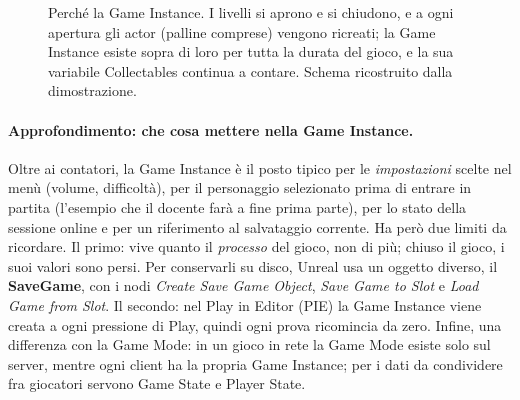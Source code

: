 \begin{figure}[htbp]
\centering
{}
\caption{Perché la Game Instance. I livelli si aprono e si chiudono, e a ogni apertura
gli actor (palline comprese) vengono ricreati; la Game Instance esiste sopra di loro per
tutta la durata del gioco, e la sua variabile Collectables continua a contare. Schema
ricostruito dalla dimostrazione.}
\label{ue8:fig:persistenza}
\end{figure}

\paragraph{Approfondimento: che cosa mettere nella Game Instance.} Oltre ai contatori, la
Game Instance è il posto tipico per le \emph{impostazioni} scelte nel menù (volume,
difficoltà), per il personaggio selezionato prima di entrare in partita (l'esempio che il
docente farà a fine prima parte), per lo stato della sessione online e per un
riferimento al salvataggio corrente. Ha però due limiti da ricordare. Il primo: vive
quanto il \emph{processo} del gioco, non di più; chiuso il gioco, i suoi valori sono
persi. Per conservarli su disco, Unreal usa un oggetto diverso, il \textbf{SaveGame},
con i nodi \emph{Create Save Game Object}, \emph{Save Game to Slot} e \emph{Load Game
from Slot}. Il secondo: nel Play in Editor (PIE) la Game Instance viene creata a ogni
pressione di Play, quindi ogni prova ricomincia da zero. Infine, una differenza con la
Game Mode: in un gioco in rete la Game Mode esiste solo sul server, mentre ogni client ha
la propria Game Instance; per i dati da condividere fra giocatori servono Game State e
Player State.

